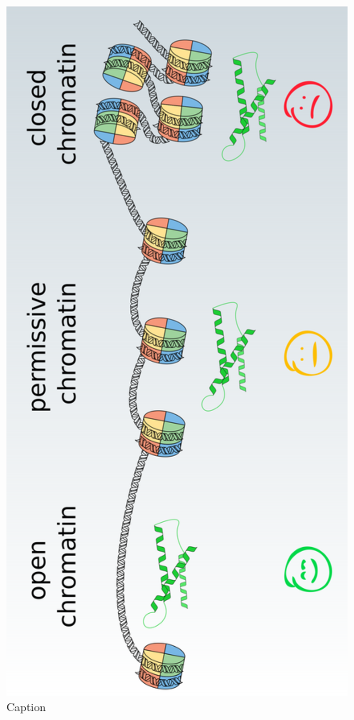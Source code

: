 \begin{figure}[hbtp]
    \includegraphics[height=0.9\textheight]{ch1.Introduction/imgs/accessibility.png}
    \caption{Caption}
    \label{fig:accessibility}
\end{figure}

